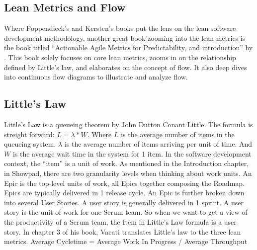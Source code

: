 \subsection{Lean Metrics and Flow}
Where Poppendieck's and Kersten's books put the lens on the lean software development methodology, another great book zooming into the lean metrics is the book titled  ``Actionable Agile Metrics for Predictability, and introduction'' by . This book solely focuses on core lean metrics, zooms in on the relationship defined by Little's law, and elaborates on the concept of flow. It also deep dives into continuous flow diagrams to illustrate and analyze flow.
\subsection{Little's Law} 
Little's Law is a queueing theorem by John Dutton Conant Little. The formula is streight forward: \begin{math}L = \lambda * W \end{math}.
Where \begin{math}L \end{math}
 is the average number of items in the queueing system.
 \begin{math} \lambda \end{math}  
 is the average number of items arriving per unit of time. And 
 \begin{math}W \end{math} 
 is the average wait time in the system for 1 item.
\newline
\newline
In the software development context, the ``item'' is a unit of work. As mentioned in the Introduction chapter, in Showpad, there are two granularity levels when thinking about work units. An \gls{Epic} is the top-level units of work, all Epics together composing the Roadmap. Epics are typically delivered in 1 release cycle. An \gls{Epic} is further broken down into several User Stories. A user story is generally delivered in 1 sprint. A user story is the unit of work for one \gls{Scrum} team. So when we want to get a view of the productivity of a \gls{Scrum} team, the Item in Little's Law formula is a user story.
\newline
\newline
In chapter 3 of his book, Vacati translates Little's law to the three lean metrics.
\newline
\newline
Average \gls{Cycletime} = Average Work In Progress / Average Throughput
\newline
\newline
